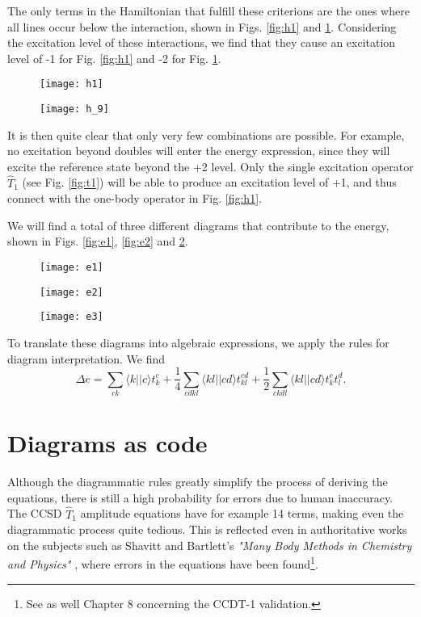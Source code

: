 The only terms in the Hamiltonian that fulfill these criterions are the ones where all lines occur below the interaction, shown in Figs. \ref{fig:h1} and \ref{fig:h_9}. Considering the excitation level of these interactions, we find that they cause an excitation level of -1 for Fig. \ref{fig:h1} and -2 for Fig. \ref{fig:h_9}.

\begin{figure}[hbtp]
  \centering
  \texttt{[image: h1]}
  \caption{}\label{fig:h1}
\endminipage\hfill
{}
  \centering
  \texttt{[image: h\_9]}
  \caption{}\label{fig:h_9}
\endminipage\hfill
\end{figure}

It is then quite clear that only very few combinations are possible.
For example, no excitation beyond doubles will enter the energy
expression, since they will excite the reference state beyond the +2
level. Only the single excitation operator $\hat{T}_1$ (see
Fig. \ref{fig:t1}) will be able to produce an excitation level of +1,
and thus connect with the one-body operator in Fig. \ref{fig:h1}.

We will find a total of three different diagrams that contribute to
the energy, shown in Figs. \ref{fig:e1}, \ref{fig:e2} and
\ref{fig:e3}.

\begin{figure}[hbtp]
  \centering
  \texttt{[image: e1]}
  \caption{}\label{fig:e1}
\endminipage\hfill
{}
  \centering
  \texttt{[image: e2]}
  \caption{}\label{fig:e2}
\endminipage\hfill
{}
  \centering
  \texttt{[image: e3]}
  \caption{}\label{fig:e3}
\endminipage\hfill
\end{figure}
 
To translate these diagrams into algebraic expressions, we apply the rules for diagram interpretation. We find 
\begin{equation}
\Delta e =  \sum_{ck} \langle k || c \rangle t_{k}^{c}+\frac{1}{4} \sum_{cdkl} \langle kl || cd \rangle t_{kl}^{cd}+\frac{1}{2} \sum_{ckdl} \langle kl || cd \rangle t_{k}^{c} t_{l}^{d}.
\label{eqn:c_energy}
\end{equation}

\section{Diagrams as code}

Although the diagrammatic rules greatly simplify the process of
deriving the equations, there is still a high probability for errors
due to human inaccuracy. The CCSD $\hat{T}_1$ amplitude equations have for example 14
terms, making even the diagrammatic process quite tedious. This is
reflected even in authoritative works on the subjects such as Shavitt
and Bartlett's \emph{"Many Body Methods in Chemistry and Physics"}
\cite{ShavittBartlett2009}, where errors in the equations have been
found\footnote{See as well Chapter 8 concerning the CCDT-1 validation.}.

